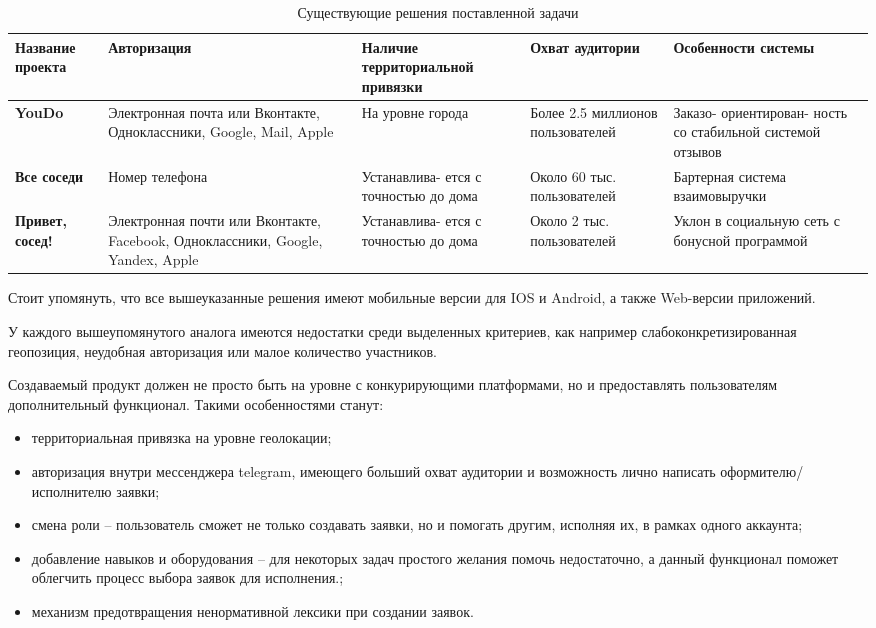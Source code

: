 \begin{table}[H]
	\centering
	\caption{Существующие решения поставленной задачи}
	\label{decisions}
	\begin{tabular}{|p{2.3cm}|p{3.3cm}|p{3cm}|p{3cm}|p{3.1cm}|}
		\hline
		\textbf{Название проекта} & \textbf{Авторизация} & \textbf{Наличие территориальной привязки} & \textbf{Охват аудитории} & \textbf{Особенности системы}\\
		\hline 
		\textbf{YouDo} & Электронная почта или Вконтакте, Одноклассники, Google, Mail, Apple & На уровне города & Более 2.5 миллионов пользователей & Заказо- ориентирован- ность со стабильной системой отзывов\\
		\hline
		\textbf{Все соседи} & Номер телефона & Устанавлива- ется с точностью до дома & Около 60 тыс. пользователей & Бартерная система взаимовыручки\\
		\hline
		\textbf{Привет, сосед!} & Электронная почти или Вконтакте, Facebook, Одноклассники, Google, Yandex, Apple & Устанавлива- ется с точностью до дома & Около 2 тыс. пользователей & Уклон в социальную сеть с бонусной программой \\
		\hline
	\end{tabular}
\end{table}

Стоит упомянуть, что все вышеуказанные решения имеют мобильные версии для IOS и Android, а также Web-версии приложений.

У каждого вышеупомянутого аналога имеются недостатки среди выделенных критериев, как например слабоконкретизированная геопозиция, неудобная авторизация или малое количество участников. 

Создаваемый продукт должен не просто быть на уровне с конкурирующими платформами, но и предоставлять пользователям дополнительный функционал. Такими особенностями станут:
\begin{itemize}
	\item территориальная привязка на уровне геолокации;
	\item авторизация внутри мессенджера telegram, имеющего больший охват аудитории и возможность лично написать оформителю/исполнителю заявки;
	\item смена роли -- пользователь сможет не только создавать заявки, но и помогать другим, исполняя их, в рамках одного аккаунта;
	\item добавление навыков и оборудования -- для некоторых задач простого желания помочь недостаточно, а данный функционал поможет облегчить процесс выбора заявок для исполнения.;
	\item механизм предотвращения ненормативной лексики при создании заявок.
\end{itemize}

